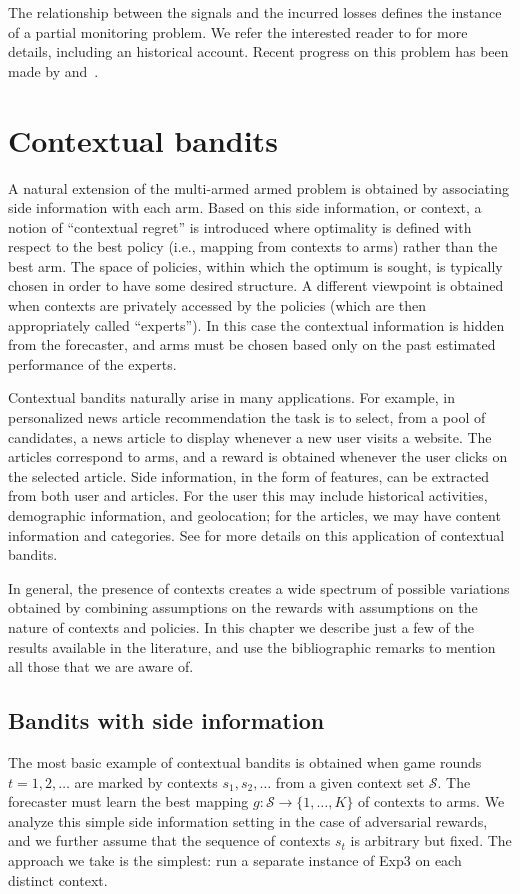 \documentclass[11pt]{hackednow}
\newcommand{\cS}{\mathcal{S}}
\begin{document}
The relationship between the signals and the incurred losses defines the instance of a partial monitoring problem. We refer the interested reader to \cite{CL06} for more details, including an historical account. Recent progress on this problem has been made by \cite{BPS10} and~\cite{FR11}.


\chapter{Contextual bandits}
\label{contextual}
A natural extension of the multi-armed armed problem is obtained by associating side information with each arm. Based on this side information, or context, a notion of ``contextual regret'' is introduced where optimality is defined with respect to the best policy (i.e., mapping from contexts to arms) rather than the best arm. The space of policies, within which the optimum is sought, is typically chosen in order to have some desired structure. A different viewpoint is obtained when contexts are privately accessed by the policies (which are then appropriately called ``experts''). In this case the contextual information is hidden from the forecaster, and arms must be chosen based only on the past estimated performance of the experts.

Contextual bandits naturally arise in many applications. For example, in personalized news article recommendation the task is to select, from a pool of candidates, a news article to display whenever a new user visits a website. The articles correspond to arms, and a reward is obtained whenever the user clicks on the selected article. Side information, in the form of features, can be extracted from both user and articles. For the user this may include historical activities, demographic information, and geolocation; for the articles, we may have content information and categories. See \cite{li2010contextual} for more details on this application of contextual bandits.


In general, the presence of contexts creates a wide spectrum of possible variations obtained by combining assumptions on the rewards with assumptions on the nature of contexts and policies. In this chapter we describe just a few of the results available in the literature, and use the bibliographic remarks to mention all those that we are aware of.

\section{Bandits with side information}
\label{s:context-intro}
%
The most basic example of contextual bandits is obtained when game rounds $t=1,2,\dots$ are marked by contexts $s_1,s_2,\dots$ from a given context set $\cS$. The forecaster must learn the best mapping $g : \cS \to \{1,\dots,K\}$ of contexts to arms. We analyze this simple side information setting in the case of adversarial rewards, and we further assume that the sequence of contexts $s_t$ is arbitrary but fixed. The approach we take is the simplest: run a separate instance of Exp3 on each distinct context.
\end{document}
